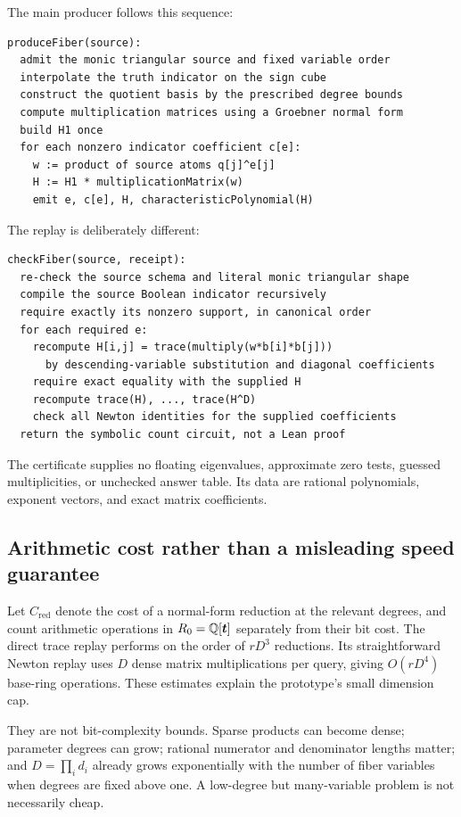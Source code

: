 The main producer follows this sequence:
\begin{lstlisting}
produceFiber(source):
  admit the monic triangular source and fixed variable order
  interpolate the truth indicator on the sign cube
  construct the quotient basis by the prescribed degree bounds
  compute multiplication matrices using a Groebner normal form
  build H1 once
  for each nonzero indicator coefficient c[e]:
    w := product of source atoms q[j]^e[j]
    H := H1 * multiplicationMatrix(w)
    emit e, c[e], H, characteristicPolynomial(H)
\end{lstlisting}
The replay is deliberately different:
\begin{lstlisting}
checkFiber(source, receipt):
  re-check the source schema and literal monic triangular shape
  compile the source Boolean indicator recursively
  require exactly its nonzero support, in canonical order
  for each required e:
    recompute H[i,j] = trace(multiply(w*b[i]*b[j]))
      by descending-variable substitution and diagonal coefficients
    require exact equality with the supplied H
    recompute trace(H), ..., trace(H^D)
    check all Newton identities for the supplied coefficients
  return the symbolic count circuit, not a Lean proof
\end{lstlisting}

The certificate supplies no floating eigenvalues, approximate zero tests, guessed multiplicities, or unchecked answer table. Its data are rational polynomials, exponent vectors, and exact matrix coefficients.

\subsection{Arithmetic cost rather than a misleading speed guarantee}

Let $C_{\mathrm{red}}$ denote the cost of a normal-form reduction at the relevant degrees, and count arithmetic operations in $R_0=\mathbb Q[\bm t]$ separately from their bit cost. The direct trace replay performs on the order of $rD^3$ reductions. Its straightforward Newton replay uses $D$ dense matrix multiplications per query, giving $O(rD^4)$ base-ring operations. These estimates explain the prototype's small dimension cap.

They are not bit-complexity bounds. Sparse products can become dense; parameter degrees can grow; rational numerator and denominator lengths matter; and $D=\prod_i d_i$ already grows exponentially with the number of fiber variables when degrees are fixed above one. A low-degree but many-variable problem is not necessarily cheap.

